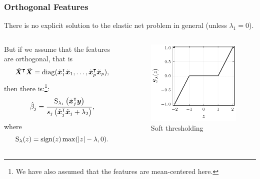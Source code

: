 \documentclass[aspectratio=1610,onlytextwidth]{beamer}
\begin{document}
\begin{frame}[c]
  \frametitle{Orthogonal Features}

  There is no explicit solution to the elastic net problem in general (unless \(\lambda_1 =
  0\)).

  \pause\bigskip

  \begin{columns}
    \begin{column}{0.5\textwidth}
      But if we assume that the features are orthogonal, that is
      \[
        \tilde{\boldsymbol{X}}^\intercal \tilde{\boldsymbol{X}} = \operatorname{diag}(\tilde{\boldsymbol{x}}_1^\intercal \tilde{\boldsymbol{x}}_1, \dots, \tilde{\boldsymbol{x}}_p^\intercal \tilde{\boldsymbol{x}}_p),
      \]
      then there is:\footnote[frame]{We have also assumed that the features are mean-centered
        here.}:
      \begin{equation*}
        \hat\beta_j = \frac{\operatorname{S}_{\lambda_1}\left(\tilde{\boldsymbol{x}}_j^\intercal \boldsymbol{y}\right)}{s_j\left(\tilde{\boldsymbol{x}}_j^\intercal \tilde{\boldsymbol{x}}_j + \lambda_2\right)},
      \end{equation*}
      where
      \[
        \operatorname{S}_\lambda(z) = \operatorname{sign}(z) \max(|z| - \lambda, 0).
      \]\pause
    \end{column}
    \begin{column}{0.4\textwidth}
      \begin{figure}[htpb]
        \centering
        \includegraphics[]{figures/soft-thresholding.pdf}
        \caption{%
          Soft thresholding
        }
      \end{figure}
    \end{column}
  \end{columns}

\end{frame}
\end{document}
